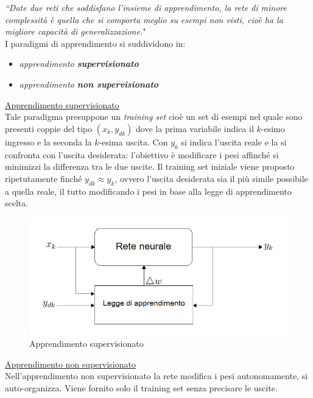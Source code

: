 \documentclass[12pt,a4paper,oneside]{book}
\begin{document}
		\textit{``Date due reti che soddisfano l'insieme di apprendimento, la rete di minore complessità è quella che si comporta meglio su esempi non visti, cioè ha la migliore capacità di generalizzazione.}"\\ 
		
		I paradigmi di apprendimento si suddividono in:
		
		\begin{itemize}
			\item \emph{apprendimento \textbf{supervisionato} }
			\item \emph{apprendimento \textbf{non supervisionato}}
		\end{itemize}
	
		\underline{Apprendimento supervisionato}\\
		Tale paradigma presuppone un \emph{training set} cioè un set di esempi nel quale sono presenti coppie del tipo $(x_{k},y_{dk})$ dove la prima variabile indica il $k$-esimo ingresso e la seconda la $k$-esima uscita. Con $y_{k}$ si indica l'uscita reale e la si confronta con l'uscita desiderata: l'obiettivo è modificare i pesi affinché si minimizzi la differenza tra le due uscite. Il training set iniziale viene proposto ripetutamente finché $y_{dk}\approx y_{k}$, ovvero l'uscita desiderata sia il più simile possibile a quella reale, il tutto modificando i pesi in base alla legge di apprendimento scelta.\\
	
		\begin{figure}[h]
			\centering
			\includegraphics[width=0.7\linewidth]{IMMAGINI/supervisionato}
			\caption{ Apprendimento supervisionato }
			\label{fig:supervisionato}
		\end{figure}
		
		\underline{Apprendimento non supervisionato}\\
		
		Nell'apprendimento non supervisionato la rete modifica i pesi autonomamente, si auto-organizza. Viene fornito solo il training set senza precisare le uscite.\\
	
\end{document}
